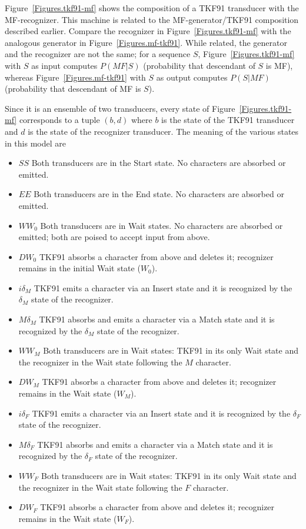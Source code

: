 \documentclass{article}
\newcommand{\figref}[1]{Figure~\ref{Figures.#1}}
\begin{document}
\figref{tkf91-mf} shows the composition of a TKF91 transducer with the MF-recognizer.  
This machine is related to the MF-generator/TKF91 composition described  earlier.  
Compare the recognizer in \figref{tkf91-mf}
with the analogous generator in \figref{mf-tkf91}. 
While related, the generator and the recognizer are not the same;
for a sequence $S$,
\figref{tkf91-mf} with $S$ as input computes $P(MF|S)$
(probability that descendant of $S$ is MF), 
whereas \figref{mf-tkf91} with $S$ as output computes $P(S|MF)$
(probability that descendant of MF is $S$).

Since it is an ensemble of two transducers, every state of \figref{tkf91-mf} corresponds to a tuple $(b,d)$
where
$b$ is the state of the TKF91 transducer and
$d$ is the state of the recognizer transducer.
The meaning of the various states in this model are
\begin{itemize}
\item $SS$ Both transducers are in the Start state.  No characters are  absorbed or emitted.
\item $EE$ Both transducers are in the End state.  No characters are  absorbed or emitted.
\item $WW_0$ Both transducers are in Wait states.  No characters are absorbed or emitted; both are poised to accept input from above. 
\item $DW_0$ TKF91 absorbs a character from above and deletes it; recognizer remains in the initial Wait state ($W_0$).  
\item $i\delta_M$ TKF91 emits a character via an Insert state and it is recognized by the $\delta_M$ state of the recognizer.  
\item $M\delta_M$ TKF91 absorbs and emits a character via a Match state and it is recognized by the $\delta_M$ state of the recognizer.  
\item $WW_M$ Both transducers are in Wait states: TKF91 in its only Wait state and the recognizer in the Wait state following the $M$ character. 
\item $DW_M$ TKF91 absorbs a character from above and deletes it; recognizer remains in the Wait state ($W_M$).  
\item $i\delta_F$ TKF91 emits a character via an Insert state and it is recognized by the $\delta_F$ state of the recognizer.  
\item $M\delta_F$ TKF91 absorbs and emits a character via a Match state and it is recognized by the $\delta_F$ state of the recognizer.  
\item $WW_F$ Both transducers are in Wait states: TKF91 in its only Wait state and the recognizer in the Wait state following the $F$ character. 
\item $DW_F$ TKF91 absorbs a character from above and deletes it; recognizer remains in the Wait state ($W_F$).  
\end{itemize}
\end{document}
